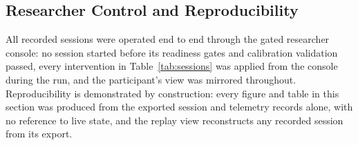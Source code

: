 \subsection{Researcher Control and Reproducibility}
\label{sec:eval-control}

All recorded sessions were operated end to end through the gated researcher console: no session started before its readiness gates and calibration validation passed, every intervention in Table~\ref{tab:sessions} was applied from the console during the run, and the participant's view was mirrored throughout.
Reproducibility is demonstrated by construction: every figure and table in this section was produced from the exported session and telemetry records alone, with no reference to live state, and the replay view reconstructs any recorded session from its export.
